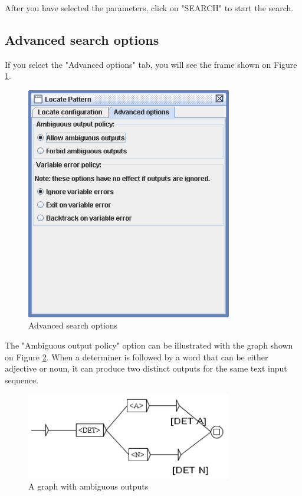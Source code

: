 \bigskip
\noindent
After you have selected the parameters, click on "SEARCH" to start the search.

\clearpage
\subsection{Advanced search options}
\label{section-advanced-search-options}
If you select the "Advanced options" tab, you will see the frame shown on
Figure \ref{fig6-advanced-options1}.

\bigskip
\begin{figure}[!h]
\begin{center}
\includegraphics[width=9cm]{resources/img/fig6-advanced-options1.png}
\caption{Advanced search options\label{fig6-advanced-options1}}
\end{center}
\end{figure}

\noindent The "Ambiguous output policy" option can be illustrated with the
graph shown on Figure \ref{fig6-advanced-options2}. When a determiner is
followed by a word that can be either adjective or noun, it can produce two
distinct outputs for the same text input sequence.

\bigskip
\begin{figure}[!h]
\begin{center}
\includegraphics[width=9cm]{resources/img/fig6-advanced-options2.png}
\caption{A graph with ambiguous outputs\label{fig6-advanced-options2}}
\end{center}
\end{figure}

